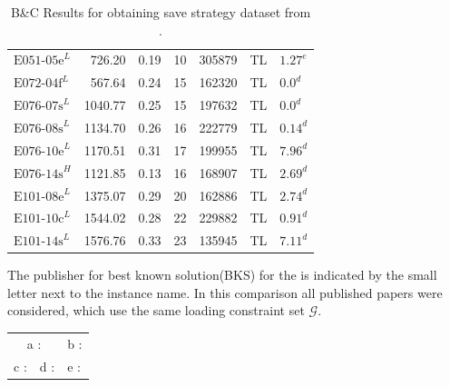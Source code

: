 \begin{table}[!h]
\begin{tabular}{lrrrrll}
        $\text{E051-05e}^L$ & 726.20  & 0.19 & 10    & 305879  & TL    & $\text{1.27}^e$ \\
        $\text{E072-04f}^L$ & 567.64  & 0.24 & 15    & 162320  & TL    & $\text{0.0}^d$  \\
        $\text{E076-07s}^L$ & 1040.77 & 0.25 & 15    & 197632  & TL    & $\text{0.0}^d$  \\
        $\text{E076-08s}^L$ & 1134.70 & 0.26 & 16    & 222779  & TL    & $\text{0.14}^d$ \\
        $\text{E076-10e}^L$ & 1170.51 & 0.31 & 17    & 199955  & TL    & $\text{7.96}^d$ \\
        $\text{E076-14s}^H$ & 1121.85 & 0.13 & 16    & 168907  & TL    & $\text{2.69}^d$ \\
        $\text{E101-08e}^L$ & 1375.07 & 0.29 & 20    & 162886  & TL    & $\text{2.74}^d$ \\
        $\text{E101-10c}^L$ & 1544.02 & 0.28 & 22    & 229882  & TL    & $\text{0.91}^d$ \\
        $\text{E101-14s}^L$ & 1576.76 & 0.33 & 23    & 135945  & TL    & $\text{7.11}^d$ \\
        \bottomrule
    \end{tabular}
    \caption{B\&C Results for obtaining save strategy dataset from \gendreauDataSet.}
    \label{tab:bc_results_gendreau}
\end{table}

The publisher for best known solution(BKS) for the \gendreauDataSetText is indicated by the small letter
next to the instance name. In this comparison all published papers were considered, which use the same loading constraint set $\mathcal{G}$.

\newcommand{\datasetPos}[2]{%
{#1} : {#2}
}
\begin{table}[ht]
    \centering
    \renewcommand{\arraystretch}{1.05}
    \begin{tabular}{@{}lll@{}}
        \multicolumn{2}{c}{\datasetPos{a}{\cite{tarantilis_hybrid_2009}}} & \datasetPos{b}{\cite{wang_two_2010}}                                                              \\
        \datasetPos{c}{\cite{bortfeldt_hybrid_2012}}                      & \datasetPos{d}{\cite{zhang_evolutionary_2015}} & \datasetPos{e}{\cite{tamke_branch-and-cut_2024}} \\
    \end{tabular}
\end{table}

